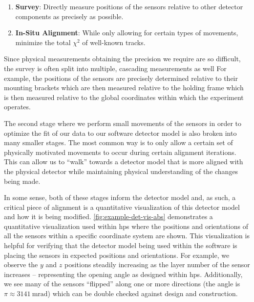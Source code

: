 \begin{enumerate}
	\item \textbf{Survey}: Directly measure positions of the sensors relative to other
	      detector components as precisely as possible.
	\item \textbf{In-Situ Alignment}: While only allowing for certain types of movements,
	      minimize the total $\chi^2$ of well-known tracks.
\end{enumerate}

Since physical measurements obtaining the precision we require are so difficult,
the survey is often split into multiple, cascading measurements as well
For example, the positions of the sensors are precisely determined relative to their
mounting brackets which are then measured relative to the holding frame
which is then measured relative to the global coordinates within which the
experiment operates.

The second stage where we perform small movements of the sensors in order to optimize
the fit of our data to our software detector model is also broken into many smaller
stages. The most common way is to only allow a certain set of physically motivated
movements to occur during certain alignment iterations. This can allow us to ``walk''
towards a detector model that is more aligned with the physical detector while
maintaining physical understanding of the changes being made.

In some sense, both of these stages inform the detector model and, as such,
a critical piece of alignment is a quantitative visualization of this detector
model and how it is being modified. \cref{fig:example-det-vis-abs} demonstrates a
quantitative visualization used within \ac{hps} where the positions and orientations of 
all the sensors within a specific coordinate system are shown.
This visualization is helpful for verifying that the detector model being used
within the software is placing the sensors in expected positions and orientations.
For example, we observe the $y$ and $z$ positions steadily increasing as the layer
number of the sensor increases -- representing the opening angle as designed within
\ac{hps}. Additionally, we see many of the sensors ``flipped'' along one or more
directions (the angle is $\pi \approx \qty{3141}{\milli\radian}$) which can be
double checked against design and construction.

